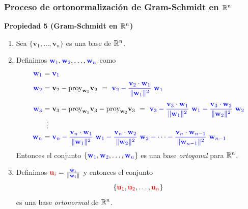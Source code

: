 {\nologo
\begin{frame}\frametitle{Proceso de ortonormalización de Gram-Schmidt en $\mathbb{R}^n$}

\vspace{-4mm}

\begin{prop}{\textbf{Propiedad 5 (Gram-Schmidt en $\mathbb{R}^n$)}}
	\justifying
	\begin{enumerate}
		\item Sea $\{\mathbf{v}_1,\hdots, \mathbf{v}_n\}$ es una base de $\mathbb{R}^n$.
		
		\item Definimos ${\color{blue}\mathbf{w}_1},{\color{blue}\mathbf{w}_2},\hdots, {\color{blue}\mathbf{w}_n}$ como
		\[
		\begin{array}{r@{\hspace{0.5\tabcolsep}}c@{\hspace{0.5\tabcolsep}}l}
		{\color{blue}\mathbf{w}_1} & = & {\color{blue}\mathbf{v}_1} \\[2mm]
		{\color{blue}\mathbf{w}_2} & = & \mathbf{v}_2 - \text{proy}_{\mathbf{w}_1} \mathbf{v}_2 \ = \ {\color{blue} \mathbf{v}_2 - 
		\dfrac{\mathbf{v}_2\cdot \mathbf{w}_1}{\Vert \mathbf{w}_1 \Vert^2}\ \mathbf{w}_1 } \\[5mm]
		{\color{blue}\mathbf{w}_3} & = & \mathbf{v}_3 - \text{proy}_{\mathbf{w}_1} \mathbf{v}_3 - \text{proy}_{\mathbf{w}_2} \mathbf{v}_3 \ = \ 
		{\color{blue} \mathbf{v}_3 - \dfrac{\mathbf{v}_3\cdot \mathbf{w}_1}{\Vert \mathbf{w}_1 \Vert^2}\ \mathbf{w}_1
		- \dfrac{\mathbf{v}_3\cdot \mathbf{w}_2}{\Vert \mathbf{w}_2 \Vert^2}\ \mathbf{w}_2 } \\[0mm]
		& \vdots & \\
		{\color{blue}\mathbf{w}_n} & = & {\color{blue} \mathbf{v}_n - \dfrac{\mathbf{v}_n\cdot \mathbf{w}_1}{\Vert \mathbf{w}_1 \Vert^2}\ \mathbf{w}_1 - \dfrac{\mathbf{v}_n\cdot \mathbf{w}_2}{\Vert \mathbf{w}_2 \Vert^2}\ \mathbf{w}_2 - \cdots
								- \dfrac{\mathbf{v}_n\cdot \mathbf{w}_{n-1}}{\Vert \mathbf{w}_{n-1} \Vert^2}\ \mathbf{w}_{n-1} }
		\end{array}
		\]
		Entonces el conjunto $\{{\color{blue}\mathbf{w}_1},{\color{blue}\mathbf{w}_2},\hdots, {\color{blue}\mathbf{w}_n}\}$ es una base \textit{ortogonal} para $\mathbb{R}^n$.
		
		\item Definimos ${\color{red}\mathbf{u}_i} = \frac{{\color{blue}\mathbf{w}_i}}{\Vert {\color{blue}\mathbf{w}_i} \Vert}$ y entonces el conjunto
		\[
			\{{\color{red}\mathbf{u}_1},{\color{red}\mathbf{u}_2},\hdots, {\color{red}\mathbf{u}_n}\}
		\]
		es una base \textit{ortonormal} de $\mathbb{R}^n$.
	\end{enumerate}
\end{prop}	

\end{frame}
}

